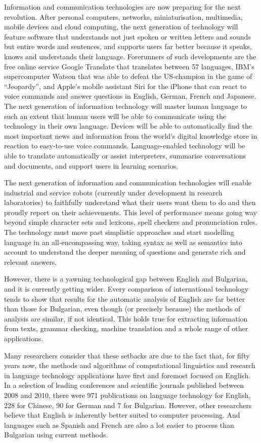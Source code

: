 \begin{multicols}{2}
Information and communication technologies are now preparing for the next revolution. After personal computers, networks, miniaturisation, multimedia, mobile devices and cloud computing, the next generation of technology will feature software that understands not just spoken or written letters and sounds but entire words and sentences, and supports users far better because it speaks, knows and understands their language. Forerunners of such developments are the free online service Google Translate that translates between 57 languages, IBM’s supercomputer Watson that was able to defeat the US-champion in the game of “Jeopardy”, and Apple’s mobile assistant Siri for the iPhone that can react to voice commands and answer questions in English, German, French and Japanese. 
The next generation of information technology will master human language to such an extent that human users will be able to communicate using the technology in their own language. Devices will be able to automatically find the most important news and information from the world’s digital knowledge store in reaction to easy-to-use voice commands. Language-enabled technology will be able to translate automatically or assist interpreters, summarise conversations and documents, and support users in learning scenarios. 

The next generation of information and communication technologies will enable industrial and service robots (currently under development in research laboratories) to faithfully understand what their users want them to do and then proudly report on their achievements. This level of performance means going way beyond simple character sets and lexicons, spell checkers and pronunciation rules. The technology must move past simplistic approaches and start modelling language in an all-encompassing way, taking syntax as well as semantics into account to understand the deeper meaning of questions and generate rich and relevant answers.

However, there is a yawning technological gap between English and Bulgarian, and it is currently getting wider. Every comparison of international technology tends to show that results for the automatic analysis of English are far better than those for Bulgarian, even though (or precisely because) the methods of analysis are similar, if not identical. This holds true for extracting information from texts, grammar checking, machine translation and a whole range of other applications. 

Many researchers consider that these setbacks are due to the fact that, for fifty years now, the methods and algorithms of computational linguistics and research in language technology applications have first and foremost focused on English. In a selection of leading conferences and scientific journals published between 2008 and 2010, there were 971 publications on language technology for English, 228 for Chinese, 90 for German and 7 for Bulgarian. However, other researchers believe that English is inherently better suited to computer processing. And languages such as Spanish and French are also a lot easier to process than Bulgarian using current methods.


\end{multicols}
